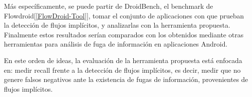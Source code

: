 
Más específicamente, se puede partir de DroidBench\cite{DroidBenchBenchmarks},
el benchmark de Flowdroid[\ref{FlowDroid-Tool}], tomar el conjunto de
aplicaciones con que prueban la detección de flujos implícitos, y analizarlas
con la herramienta propuesta.\newline
Finalmente estos resultados serían
comparados con los obtenidos mediante otras herramientas para análisis de fuga
de información en aplicaciones Android.\newline

En este orden de ideas, la evaluación de la herramienta propuesta está enfocada
en: medir recall frente a la detección de flujos implícitos, es decir, medir que
no genere falsos negativos ante la existencia de fugas de información,
provenientes de flujos implícitos.\newline







